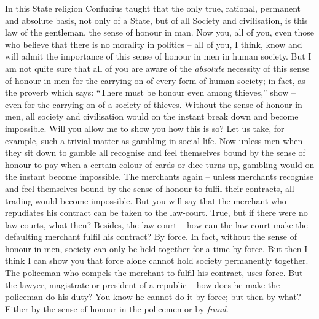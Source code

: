 In this State religion Confucius taught that the only true, rational, permanent and absolute basis, not only of a State, but of all Society and civilisation, is this law of the gentleman, the sense of honour in man. Now you, all of you, even those who believe that there is no morality in politics -- all of you, I think, know and will admit the importance of this sense of honour in men in human society. But I am not quite sure that all of you are aware of the \emph{absolute} necessity of this sense of honour in men for the carrying on of every form of human society; in fact, as the proverb which says: ``There must be honour even among thieves,'' show -- even for the carrying on of a society of thieves. Without the sense of honour in men, all society and civilisation would on the instant break down and become impossible. Will you allow me to show you how this is so? Let us take, for example, such a trivial matter as gambling in social life. Now unless men when they sit down to gamble all recognise and feel themselves bound by the sense of honour to pay when a certain colour of cards or dice turns up, gambling would on the instant become impossible. The merchants again -- unless merchants recognise and feel themselves bound by the sense of honour to fulfil their contracts, all trading would become impossible. But you will say that the merchant who repudiates his contract can be taken to the law-court. True, but if there were no law-courts, what then? Besides, the law-court -- how can the law-court make the defaulting merchant fulfil his contract? By force. In fact, without the sense of honour in men, society can only be held together for a time by force. But then I think I can show you that force alone cannot hold society permanently together. The policeman who compels the merchant to fulfil his contract, uses force. But the lawyer, magistrate or president of a republic -- how does he make the policeman do his duty? You know he cannot do it by force; but then by what? Either by the sense of honour in the policemen or by \emph{fraud}.

